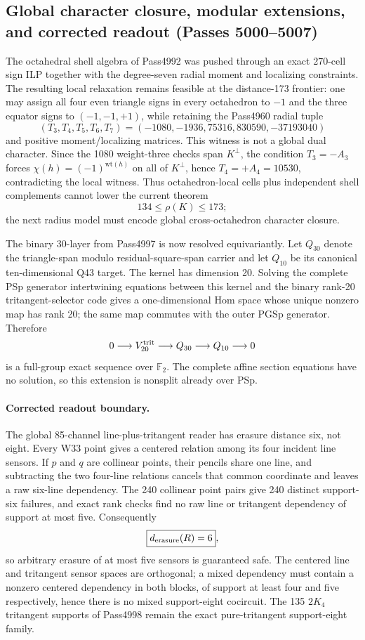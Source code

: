\subsection*{Global character closure, modular extensions, and corrected readout (Passes 5000--5007)}
The octahedral shell algebra of Pass4992 was pushed through an exact 270-cell sign ILP together with the degree-seven radial moment and localizing constraints.  The resulting local relaxation remains feasible at the distance-173 frontier: one may assign all four even triangle signs in every octahedron to $-1$ and the three equator signs to $(-1,-1,+1)$, while retaining the Pass4960 radial tuple
\[
(T_3,T_4,T_5,T_6,T_7)=(-1080,-1936,75316,830590,-37193040)
\]
and positive moment/localizing matrices.  This witness is not a global dual character.  Since the 1080 weight-three checks span $K^\perp$, the condition $T_3=-A_3$ forces $\chi(h)=(-1)^{\mathrm{wt}(h)}$ on all of $K^\perp$, hence $T_4=+A_4=10530$, contradicting the local witness.  Thus octahedron-local cells plus independent shell complements cannot lower the current theorem
\[
134\leq\rho(K)\leq173;
\]
the next radius model must encode global cross-octahedron character closure.

The binary 30-layer from Pass4997 is now resolved equivariantly.  Let $Q_{30}$ denote the triangle-span modulo residual-square-span carrier and let $Q_{10}$ be its canonical ten-dimensional Q43 target.  The kernel has dimension 20.  Solving the complete PSp generator intertwining equations between this kernel and the binary rank-20 tritangent-selector code gives a one-dimensional Hom space whose unique nonzero map has rank 20; the same map commutes with the outer PGSp generator.  Therefore
\[
0\longrightarrow V_{20}^{\rm trit}\longrightarrow Q_{30}\longrightarrow Q_{10}\longrightarrow0
\]
is a full-group exact sequence over $\mathbb F_2$.  The complete affine section equations have no solution, so this extension is nonsplit already over PSp.

\paragraph{Corrected readout boundary.}
The global 85-channel line-plus-tritangent reader has erasure distance six, not eight.  Every W33 point gives a centered relation among its four incident line sensors.  If $p$ and $q$ are collinear points, their pencils share one line, and subtracting the two four-line relations cancels that common coordinate and leaves a raw six-line dependency.  The 240 collinear point pairs give 240 distinct support-six failures, and exact rank checks find no raw line or tritangent dependency of support at most five.  Consequently
\[
\boxed{d_{\rm erasure}(R)=6},
\]
so arbitrary erasure of at most five sensors is guaranteed safe.  The centered line and tritangent sensor spaces are orthogonal; a mixed dependency must contain a nonzero centered dependency in both blocks, of support at least four and five respectively, hence there is no mixed support-eight cocircuit.  The 135 $2K_4$ tritangent supports of Pass4998 remain the exact pure-tritangent support-eight family.


